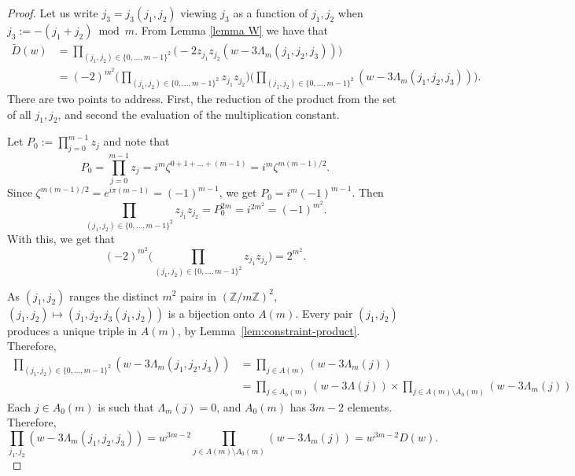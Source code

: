 \documentclass[10pt,a4paper]{amsart}
\theoremstyle{plain}
\theoremstyle{remark}
\begin{document}
\begin{proof}
Let us write $j_3=j_3(j_1,j_2)$ viewing $j_{3}$ as a function of $j_{1}, j_{2}$ when $j_{3}:=-(j_1+j_2)\bmod m$. From Lemma \ref{lemma W} we have that
\begin{align*}
\widetilde D(w) &= \prod_{(j_1,j_2)\in\{0,...,m-1\}^2}\Big({-}2z_{j_1}z_{j_2}(w-3\Lambda_{m}(j_1,j_2,j_3))\Big)
\\&= (-2)^{m^2}\Big(\prod_{(j_1,j_2)\in\{0,...,m-1\}^2}z_{j_1}z_{j_2}\Big)\Big(\prod_{(j_1,j_2)\in\{0,...,m-1\}^2}(w-3\Lambda_{m}(j_1,j_2,j_3))\Big).
\end{align*}
There are two points to address.  First, the reduction of the product from the set of all $j_{1}, j_{2}$, and second
the evaluation of the multiplication constant.

Let $P_0:=\prod_{j=0}^{m-1}z_j$ and note that
$$
P_{0}=\prod_{j=0}^{m-1}z_j = i^m\zeta^{0+1+\dots+(m-1)}=i^m\zeta^{m(m-1)/2}.
$$
Since $\zeta^{m(m-1)/2}=e^{i\pi(m-1)}=(-1)^{m-1}$, we get
$P_0=i^m(-1)^{m-1}$. Then
$$
\prod_{(j_1,j_2)\in\{0,...,m-1\}^2}z_{j_1}z_{j_2}=P_0^{2m}=i^{2m^2}=(-1)^{m^2}.
$$
With this, we get that
$$
(-2)^{m^2}\Big(\prod_{(j_1,j_2)\in\{0,...,m-1\}^2}z_{j_1}z_{j_2}\Big)=2^{m^{2}}.
$$

As $(j_1,j_2)$ ranges the distinct $m^2$
pairs in $(\mathbb Z/m\mathbb Z)^2$,
$(j_1,j_2)\mapsto(j_1,j_2,j_3(j_1,j_2))$ is a bijection onto $A(m)$. Every pair $(j_1,j_2)$
produces a unique triple in $A(m)$, by
Lemma~\ref{lem:constraint-product}.  Therefore,
\begin{align*}
\prod_{(j_1,j_2)\in\{0,...,m-1\}^2}(w-3\Lambda_{m}(j_1,j_2,j_3)) &=
\prod_{j\in A(m)}(w-3\Lambda_{m}(j)) \\&=
\prod_{j\in A_0(m)} (w-3 \Lambda(j))\times
\prod_{j\in A(m)\setminus A_0(m)}(w-3\Lambda_{m}(j))
\end{align*}
Each $j \in A_0(m)$ is such that $\Lambda_{m}(j)=0$,
and $A_0(m)$ has $3m-2$ elements.
Therefore,
$$
\prod_{j_1,j_2}(w-3\Lambda_{m}(j_1,j_2,j_3))
= w^{3m-2}\prod_{j\in A(m)\setminus A_0(m)}(w-3\Lambda_{m}(j))
= w^{3m-2}D(w).
$$
\end{proof}
\end{document}
